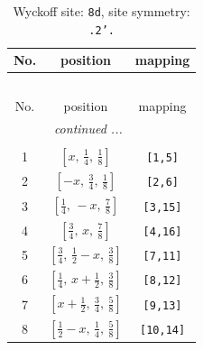 \documentclass[fleqn,8pt]{jsarticle}
\begin{document}
\begin{longtable}{ccc}
\caption{Wyckoff site: {\tt 8d}, site symmetry: {\tt .2'.}}
 \\
 \hline \hline
No. & position & mapping \\ \hline \endfirsthead

\multicolumn{2}{l}{\tablename\ \thetable{}} \\
 \hline \hline
No. & position & mapping \\ \hline \endhead

 \hline \hline
\multicolumn{2}{r}{\footnotesize\it continued ...} \\ \endfoot

 \hline \hline
\multicolumn{2}{r}{} \\ \endlastfoot

1 & $\left[ x,\, \frac{1}{4},\, \frac{1}{8} \right]$ & {\tt [1,5]} \\ \hline
2 & $\left[ - x,\, \frac{3}{4},\, \frac{1}{8} \right]$ & {\tt [2,6]} \\ \hline
3 & $\left[ \frac{1}{4},\, - x,\, \frac{7}{8} \right]$ & {\tt [3,15]} \\ \hline
4 & $\left[ \frac{3}{4},\, x,\, \frac{7}{8} \right]$ & {\tt [4,16]} \\ \hline
5 & $\left[ \frac{3}{4},\, \frac{1}{2} - x,\, \frac{3}{8} \right]$ & {\tt [7,11]} \\ \hline
6 & $\left[ \frac{1}{4},\, x + \frac{1}{2},\, \frac{3}{8} \right]$ & {\tt [8,12]} \\ \hline
7 & $\left[ x + \frac{1}{2},\, \frac{3}{4},\, \frac{5}{8} \right]$ & {\tt [9,13]} \\ \hline
8 & $\left[ \frac{1}{2} - x,\, \frac{1}{4},\, \frac{5}{8} \right]$ & {\tt [10,14]} \\
\end{longtable}
\renewcommand{\arraystretch}{1.2}
\end{document}
